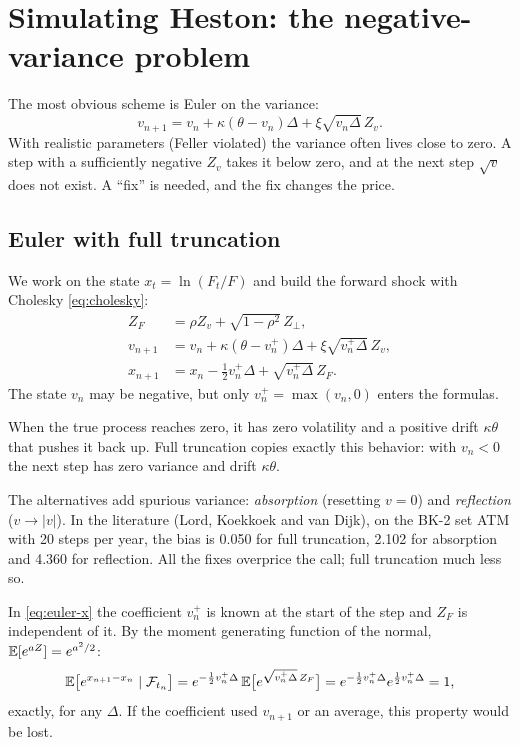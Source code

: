 \section{Simulating Heston: the negative-variance problem}
The most obvious scheme is Euler on the variance:
\[
v_{n+1}=v_n+\kappa(\theta-v_n)\Delta+\xi\sqrt{v_n\Delta}\,Z_v .
\]
With realistic parameters (Feller violated) the variance often lives close to zero. A step with a sufficiently
negative $Z_v$ takes it below zero, and at the next step $\sqrt v$ does not exist. A ``fix'' is needed, and the fix
changes the price.

\subsection{Euler with full truncation}
We work on the state $x_t=\ln(F_t/F)$ and build the forward shock with Cholesky \eqref{eq:cholesky}:
\begin{align}
Z_F&=\rho Z_v+\sqrt{1-\rho^2}\,Z_\perp,\label{eq:euler-zf}\\
v_{n+1}&=v_n+\kappa(\theta-v_n^+)\Delta+\xi\sqrt{v_n^+\Delta}\,Z_v,\label{eq:euler-ft}\\
x_{n+1}&=x_n-\tfrac12v_n^+\Delta+\sqrt{v_n^+\Delta}\,Z_F .\label{eq:euler-x}
\end{align}
The state $v_n$ may be negative, but only $v_n^+=\max(v_n,0)$ enters the formulas.

\begin{perche}[title={Why full truncation in particular}]
When the true process reaches zero, it has zero volatility and a positive drift $\kappa\theta$ that pushes it back
up. Full truncation copies exactly this behavior: with $v_n<0$ the next step has zero variance and drift
$\kappa\theta$.

The alternatives add spurious variance: \emph{absorption} (resetting $v=0$) and \emph{reflection} ($v\to|v|$). In the
literature (Lord, Koekkoek and van Dijk), on the BK-2 set ATM with 20 steps per year, the bias is 0.050 for full
truncation, 2.102 for absorption and 4.360 for reflection. All the fixes overprice the call; full truncation much
less so.
\end{perche}

\begin{idea}[title={The forward stays an exact martingale}]
In \eqref{eq:euler-x} the coefficient $v_n^+$ is known at the start of the step and $Z_F$ is independent of it. By the
moment generating function of the normal, $\mathbb{E}[e^{aZ}]=e^{a^2/2}$:
\[
\mathbb{E}\big[e^{x_{n+1}-x_n}\mid\mathcal F_{t_n}\big]
=e^{-\frac12v_n^+\Delta}\,\mathbb{E}\big[e^{\sqrt{v_n^+\Delta}\,Z_F}\big]
=e^{-\frac12v_n^+\Delta}e^{\frac12v_n^+\Delta}=1,
\]
exactly, for any $\Delta$. If the coefficient used $v_{n+1}$ or an average, this property would be lost.
\end{idea}

